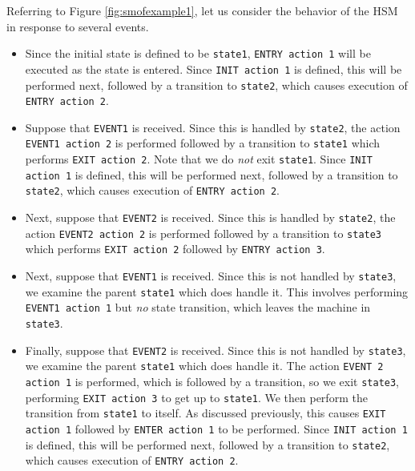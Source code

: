 \documentclass[12pt]{article}
\begin{document}
Referring to Figure \ref{fig:smofexample1}, let us consider the behavior of the HSM in response to several events.
\begin{itemize}
	\item Since the initial state is defined to be \texttt{state1}, \texttt{ENTRY action 1} will be executed as the state is entered. Since \texttt{INIT action 1} is defined, this will be performed next, followed by a transition to \texttt{state2}, which causes execution of \texttt{ENTRY action 2}.
	
	\item Suppose that \texttt{EVENT1} is received. Since this is handled by \texttt{state2}, the action \texttt{EVENT1 action 2} is performed followed by a transition to \texttt{state1} which performs \texttt{EXIT action 2}. Note that we do \emph{not} exit \texttt{state1}. Since \texttt{INIT action 1} is defined, this will be performed next, followed by a transition to \texttt{state2}, which causes execution of \texttt{ENTRY action 2}.
	
	\item Next, suppose that \texttt{EVENT2} is received. Since this is handled by \texttt{state2}, the action \texttt{EVENT2 action 2} is performed followed by a transition to \texttt{state3} which performs \texttt{EXIT action 2} followed by \texttt{ENTRY action 3}.
	
	\item Next, suppose that \texttt{EVENT1} is received. Since this is not handled by \texttt{state3}, we examine the parent \texttt{state1} which does handle it. This involves performing \texttt{EVENT1 action 1} but \emph{no} state transition, which leaves the machine in \texttt{state3}.
	
	\item Finally, suppose that \texttt{EVENT2} is received. Since this is not handled by \texttt{state3}, we examine the parent \texttt{state1} which does handle it. The action \texttt{EVENT 2 action 1} is performed, which is followed by a transition, so we exit \texttt{state3}, performing \texttt{EXIT action 3} to get up to \texttt{state1}. We then perform the transition from \texttt{state1} to itself. As discussed previously, this causes \texttt{EXIT action 1} followed by \texttt{ENTER action 1} to be performed. Since \texttt{INIT action 1} is defined, this will be performed next, followed by a transition to \texttt{state2}, which causes execution of \texttt{ENTRY action 2}.
		
\end{itemize}
\end{document}
